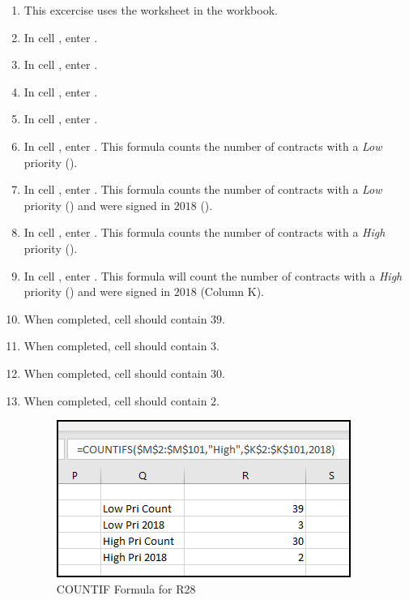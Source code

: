 \begin{enumerate}
	\item This excercise uses the  worksheet in the  workbook.
	\item In cell , enter .
	\item In cell , enter .
	\item In cell , enter .
	\item In cell , enter .
	\item In cell , enter . This formula counts the number of contracts with a \textit{Low} priority ().
	\item In cell , enter . This formula counts the number of contracts with a \textit{Low} priority () and were signed in $ 2018 $ ().
	\item In cell , enter . This formula counts the number of contracts with a \textit{High} priority ().
	\item In cell , enter . This formula will count the number of contracts with a \textit{High} priority () and were signed in $ 2018 $ (Column K).
	\item When completed, cell  should contain $ 39 $.
	\item When completed, cell  should contain $ 3 $.
	\item When completed, cell  should contain $ 30 $.
	\item When completed, cell  should contain $ 2 $.
	
	\begin{figure}[H]
		\centering
		\includegraphics[width=\maxwidth{.75\linewidth}]{gfx/ch09_fig43}
		\caption{COUNTIF Formula for R28}
		\label{09:fig43}
	\end{figure}
		
\end{enumerate}

